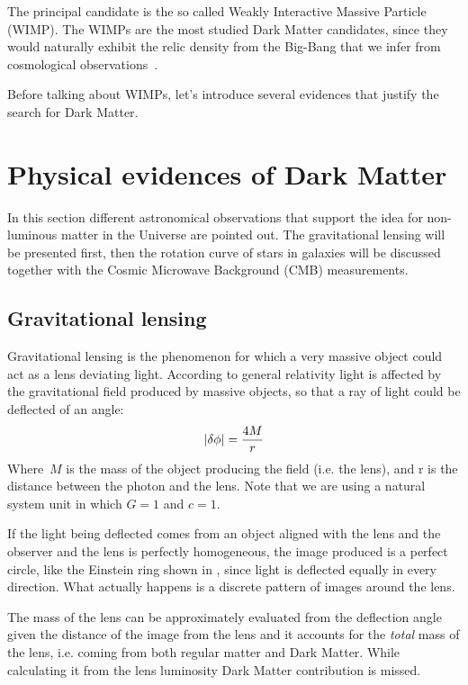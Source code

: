 The principal candidate is the so called Weakly Interactive Massive Particle (WIMP). The WIMPs are the most studied Dark Matter candidates, since they would naturally exhibit the relic density from the Big-Bang that we infer from cosmological observations~\cite{feng:DM}.

Before talking about WIMPs, let's introduce several evidences that justify the search for Dark Matter.

\section{Physical evidences of Dark Matter}
In this section different astronomical observations that support the idea for non-luminous matter in the Universe are pointed out. The gravitational lensing will be presented first, then the rotation curve of stars in galaxies will be discussed together with the Cosmic Microwave Background (CMB) measurements.

\subsection{Gravitational lensing}
Gravitational lensing is the phenomenon for which a very massive object could act as a lens deviating light. According to general relativity light is affected by the gravitational field produced by massive objects, so that a ray of light could be deflected of an angle:
\begin{equation}
\lvert\delta\phi\rvert=\frac{4M}{r}
\end{equation}
Where $\,M$ is the mass of the object producing the field (i.e. the lens), and r is the distance between the photon and the lens. Note that we are using a natural system unit in which $G=1$ and $c=1$.

If the light being deflected comes from an object aligned with the lens and the observer and the lens is perfectly homogeneous, the image produced is a perfect circle, like the Einstein ring shown in \Fig{\ref{fig:einsteinring}}, since light is deflected equally in every direction. What actually happens is a discrete pattern of images around the lens.

The mass of the lens can be approximately evaluated from the deflection angle given the distance of the image from the lens and it accounts for the \emph{total} mass of the lens, i.e. coming from both regular matter and Dark Matter. While calculating it from the lens luminosity Dark Matter contribution is missed.

